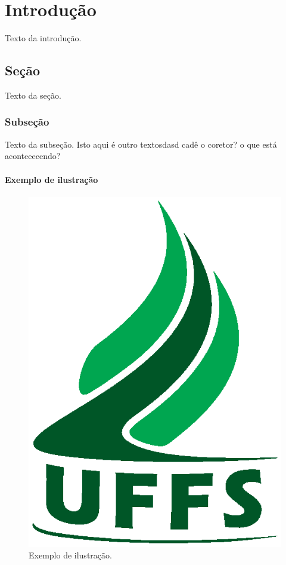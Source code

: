 \chapter{Introdução}

Texto da introdução.

\section{Seção}

Texto da seção.

\subsection{Subseção}

Texto da subseção. Isto aqui é outro textosdasd cadê o coretor?
o que está aconteeecendo?


\subsubsection{Exemplo de ilustração}

\begin{figure}[h]
\captionsetup{justification=raggedright, singlelinecheck=false}
\centering
\includegraphics[scale=0.4]{figuras/uffs.eps}
\caption{Exemplo de ilustração.}
\label{fig:uffs}
\end{figure}

